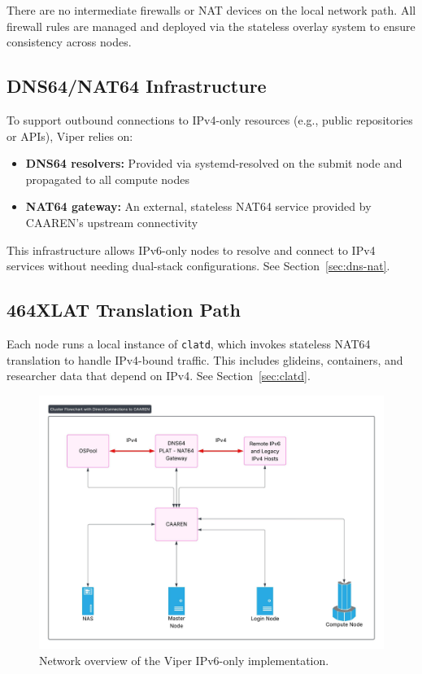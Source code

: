 \documentclass[11pt]{article}
\begin{document}
There are no intermediate firewalls or NAT devices on the local network path. All firewall rules are managed and deployed via the stateless overlay system to ensure consistency across nodes.

\subsection{DNS64/NAT64 Infrastructure}

To support outbound connections to IPv4-only resources (e.g., public repositories or APIs), Viper relies on:
\begin{itemize}[leftmargin=*,label=--,itemsep=1pt]
    \item \textbf{DNS64 resolvers:} Provided via systemd-resolved on the submit node and propagated to all compute nodes
    \item \textbf{NAT64 gateway:} An external, stateless NAT64 service provided by CAAREN’s upstream connectivity 
\end{itemize}

This infrastructure allows IPv6-only nodes to resolve and connect to IPv4 services without needing dual-stack configurations. See Section~\ref{sec:dns-nat}.

\subsection{464XLAT Translation Path}

Each node runs a local instance of \texttt{clatd}, which invokes stateless NAT64 translation to handle IPv4-bound traffic. This includes glideins, containers, and researcher data that depend on IPv4. See Section~\ref{sec:clatd}.



\begin{figure}[htbp]
  \centering
  \includegraphics[width=0.49\linewidth]{Viper_Network.jpeg}
  \caption{Network overview of the Viper IPv6-only implementation.}
  \label{fig:viper-network}
\end{figure}
\end{document}
